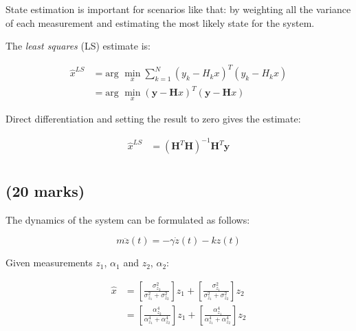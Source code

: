State estimation is important for scenarios like that: by weighting all the variance of each measurement and estimating the most likely state for the system.

The \textit{least squares} (LS) estimate is:

\begin{align*}
    \hat{x}^{LS}
    &= \text{arg } \min_x \sum_{k=1}^{N} (y_k - H_k x)^T (y_k - H_k x) \\
    &= \text{arg } \min_x (\textbf{y} - \textbf{H} x)^T (\textbf{y} - \textbf{H} x)
\end{align*}

\clearpage

Direct differentiation and setting the result to zero gives the estimate:

\begin{align*}
    \hat{x}^{LS} &= (\textbf{H}^T\textbf{H})^{-1} \textbf{H}^T \textbf{y} \\
\end{align*}



\subsection{(20 marks)}

The dynamics of the system can be formulated as follows:

\begin{equation*}
    m \ddot{z}(t) = -\gamma \dot{z}(t) - k z(t)
\end{equation*}

Given measurements $z_1$, $\alpha_1$ and $z_2$, $\alpha_2$:

\begin{align*}
    \hat{x} &=
    [\frac{\sigma^2_{z_2}}{\sigma^2_{z_1} + \sigma^2_{z_2}}] z_1 +
    [\frac{\sigma^2_{z_1}}{\sigma^2_{z_1} + \sigma^2_{z_2}}] z_2 \\
    &=
    [\frac{\alpha^4_{z_2}}{\alpha^4_{z_1} + \alpha^4_{z_2}}] z_1 +
    [\frac{\alpha^4_{z_1}}{\alpha^4_{z_1} + \alpha^4_{z_2}}] z_2 \\
\end{align*}

